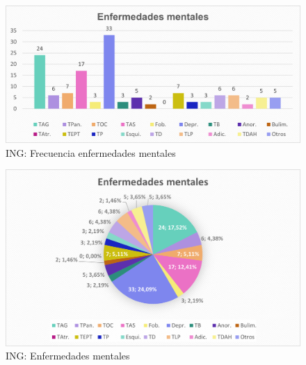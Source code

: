 \documentclass[12pt, a4paper,twoside,titlepage]{book}
\begin{document}
\begin{figure}
    \centering
    \includegraphics[width=.8\linewidth]{ANEXO ING/21AnexINGEng}
    \caption{ING: Frecuencia enfermedades mentales}
    \label{fig:INGTenidas}
\end{figure}
\begin{figure}
    \centering
    \includegraphics[width=.8\linewidth]{ANEXO ING/22AnexINGEnf}
    \caption{ING: Enfermedades mentales}
      \label{fig:INGTenidaspor}
\end{figure}
\end{document}
